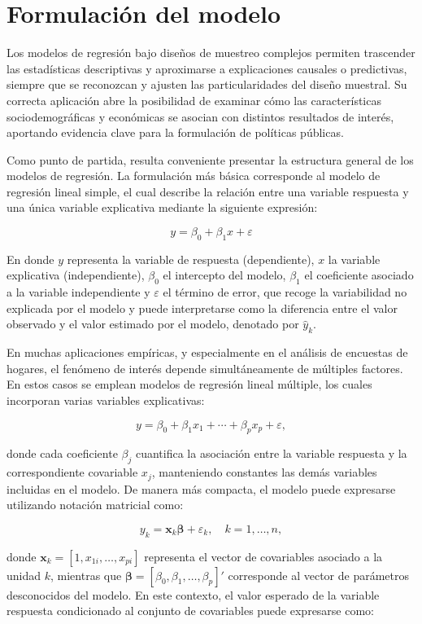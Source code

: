 \documentclass[
  spanish,
  12pt,
]{book}
\begin{document}
\section{Formulación del modelo}\label{formulacion-del-modelo}

Los modelos de regresión bajo diseños de muestreo complejos permiten trascender las estadísticas descriptivas y aproximarse a explicaciones causales o predictivas, siempre que se reconozcan y ajusten las particularidades del diseño muestral. Su correcta aplicación abre la posibilidad de examinar cómo las características sociodemográficas y económicas se asocian con distintos resultados de interés, aportando evidencia clave para la formulación de políticas públicas.

Como punto de partida, resulta conveniente presentar la estructura general de los modelos de regresión. La formulación más básica corresponde al modelo de regresión lineal simple, el cual describe la relación entre una variable respuesta y una única variable explicativa mediante la siguiente expresión:

\[
y = \beta_{0} + \beta_{1}x + \varepsilon
\]

En donde \(y\) representa la variable de respuesta (dependiente), \(x\) la variable explicativa (independiente), \(\beta_{0}\) el intercepto del modelo, \(\beta_{1}\) el coeficiente asociado a la variable independiente y \(\varepsilon\) el término de error, que recoge la variabilidad no explicada por el modelo y puede interpretarse como la diferencia entre el valor observado y el valor estimado por el modelo, denotado por \(\hat{y}_k\).

En muchas aplicaciones empíricas, y especialmente en el análisis de encuestas de hogares, el fenómeno de interés depende simultáneamente de múltiples factores. En estos casos se emplean modelos de regresión lineal múltiple, los cuales incorporan varias variables explicativas:

\[
y = \beta_{0} + \beta_{1}x_{1} + \cdots + \beta_{p}x_{p} + \varepsilon,
\]

donde cada coeficiente \(\beta_{j}\) cuantifica la asociación entre la variable respuesta y la correspondiente covariable \(x_{j}\), manteniendo constantes las demás variables incluidas en el modelo. De manera más compacta, el modelo puede expresarse utilizando notación matricial como:

\[
y_{k} = \mathbf{x}_{k}\boldsymbol{\beta} + \varepsilon_{k}, \quad k=1,\ldots,n,
\]

donde \(\mathbf{x}_{k} = [1, x_{1i}, \ldots, x_{pi}]\) representa el vector de covariables asociado a la unidad \(k\), mientras que \(\boldsymbol{\beta} = [\beta_{0}, \beta_{1}, \ldots, \beta_{p}]'\) corresponde al vector de parámetros desconocidos del modelo. En este contexto, el valor esperado de la variable respuesta condicionado al conjunto de covariables puede expresarse como:
\end{document}
